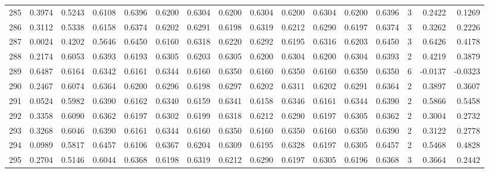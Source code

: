 \begin{tabular}{lrrrrrrrrrrrrrrr}
285 &      0.3974 &  0.5243 &  0.6108 &  0.6396 &  0.6200 &  0.6304 &  0.6200 &  0.6304 &  0.6200 &  0.6304 &   0.6200 &     0.6396 &      3 &                    0.2422 &                     0.1269 \\
286 &      0.3112 &  0.5338 &  0.6158 &  0.6374 &  0.6202 &  0.6291 &  0.6198 &  0.6319 &  0.6212 &  0.6290 &   0.6197 &     0.6374 &      3 &                    0.3262 &                     0.2226 \\
287 &      0.0024 &  0.4202 &  0.5646 &  0.6450 &  0.6160 &  0.6318 &  0.6220 &  0.6292 &  0.6195 &  0.6316 &   0.6203 &     0.6450 &      3 &                    0.6426 &                     0.4178 \\
288 &      0.2174 &  0.6053 &  0.6393 &  0.6193 &  0.6305 &  0.6203 &  0.6305 &  0.6200 &  0.6304 &  0.6200 &   0.6304 &     0.6393 &      2 &                    0.4219 &                     0.3879 \\
289 &      0.6487 &  0.6164 &  0.6342 &  0.6161 &  0.6344 &  0.6160 &  0.6350 &  0.6160 &  0.6350 &  0.6160 &   0.6350 &     0.6350 &      6 &                   -0.0137 &                    -0.0323 \\
290 &      0.2467 &  0.6074 &  0.6364 &  0.6200 &  0.6296 &  0.6198 &  0.6297 &  0.6202 &  0.6311 &  0.6202 &   0.6291 &     0.6364 &      2 &                    0.3897 &                     0.3607 \\
291 &      0.0524 &  0.5982 &  0.6390 &  0.6162 &  0.6340 &  0.6159 &  0.6341 &  0.6158 &  0.6346 &  0.6161 &   0.6344 &     0.6390 &      2 &                    0.5866 &                     0.5458 \\
292 &      0.3358 &  0.6090 &  0.6362 &  0.6197 &  0.6302 &  0.6199 &  0.6318 &  0.6212 &  0.6290 &  0.6197 &   0.6305 &     0.6362 &      2 &                    0.3004 &                     0.2732 \\
293 &      0.3268 &  0.6046 &  0.6390 &  0.6161 &  0.6344 &  0.6160 &  0.6350 &  0.6160 &  0.6350 &  0.6160 &   0.6350 &     0.6390 &      2 &                    0.3122 &                     0.2778 \\
294 &      0.0989 &  0.5817 &  0.6457 &  0.6106 &  0.6367 &  0.6204 &  0.6309 &  0.6195 &  0.6328 &  0.6197 &   0.6305 &     0.6457 &      2 &                    0.5468 &                     0.4828 \\
295 &      0.2704 &  0.5146 &  0.6044 &  0.6368 &  0.6198 &  0.6319 &  0.6212 &  0.6290 &  0.6197 &  0.6305 &   0.6196 &     0.6368 &      3 &                    0.3664 &                     0.2442 \\

\end{tabular}
